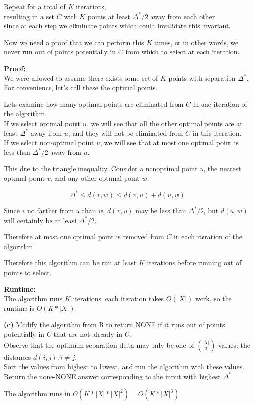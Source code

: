 \documentclass[11pt]{article}
\renewcommand{\part}[1] {\vspace{.10in} {\bf (#1)}}
\begin{document}
Repeat for a total of $K$ iterations,\\
resulting in a set $C$ with $K$ points at least $\Delta^{*} / 2$ away from each other\\
since at each step we eliminate points which could invalidate this invariant.

Now we need a proof that we can perform this $K$ times, or in other words, we never run out of points potentially in $C$ from which to select at each iteration.

\textbf{Proof:}\\
We were allowed to assume there exists some set of $K$ points with separation $\Delta^{*}$.\\
For convenience, let's call these the optimal points.

Lets examine how many optimal points are eliminated from $C$ in one iteration of the algorithm.\\
If we select optimal point $u$, we will see that all the other optimal points are at least $\Delta^{*}$ away from $u$, and they will not be eliminated from $C$ in this iteration.\\
If we select non-optimal point $u$, we will see that at most one optimal point is less than $\Delta^{*} / 2$ away from $u$.

This due to the triangle inequality. Consider a nonoptimal point $u$, the nearest optimal point $v$, and any other optimal point $w$.

$$\Delta^{*} \leq d(v,w) \leq d(v,u) + d(u,w)$$

Since $v$ no farther from  $u$ than $w$, $d(v,u)$ may be less than $\Delta^{*} / 2$, but $d(u,w)$ will certainly be at least $\Delta^{*} / 2$.

Therefore at most one optimal point is removed from $C$ in each iteration of the algorithm.

Therefore this algorithm can be run at least $K$ iterations before running out of points to select.

\textbf{Runtime:}\\
The algorithm runs $K$ iterations, each iteration takes $O(|X|)$ work, so the runtime is $O(K*|X|)$.

\part{c}
Modify the algorithm from B to return NONE if it runs out of points potentially in $C$ that are not already in $C$.\\
Observe that the optimum separation delta may only be one of $\binom{|X|}{2}$ values: the distances $d(i,j) : i \neq j$.\\
Sort the values from highest to lowest, and run the algorithm with these values.\\
Return the none-NONE answer corresponding to the input with highest $\Delta^{*}$

The algorithm runs in $O(K*|X|*|X|^2) = O(K*|X|^3)$
\end{document}
